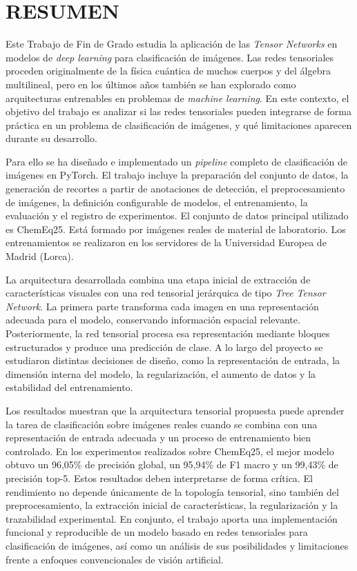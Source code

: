 \chapter*{RESUMEN}\label{sec:Resumen}

Este Trabajo de Fin de Grado estudia la aplicación de las \textit{Tensor Networks} en modelos de \textit{deep learning} para clasificación de imágenes. Las redes tensoriales proceden originalmente de la física cuántica de muchos cuerpos y del álgebra multilineal, pero en los últimos años también se han explorado como arquitecturas entrenables en problemas de \textit{machine learning}. En este contexto, el objetivo del trabajo es analizar si las redes tensoriales pueden integrarse de forma práctica en un problema de clasificación de imágenes, y qué limitaciones aparecen durante su desarrollo.

Para ello se ha diseñado e implementado un \textit{pipeline} completo de clasificación de imágenes en PyTorch. El trabajo incluye la preparación del conjunto de datos, la generación de recortes a partir de anotaciones de detección, el preprocesamiento de imágenes, la definición configurable de modelos, el entrenamiento, la evaluación y el registro de experimentos. El conjunto de datos principal utilizado es ChemEq25. Está formado por imágenes reales de material de laboratorio. Los entrenamientos se realizaron en los servidores de la Universidad Europea de Madrid (Lorca).

La arquitectura desarrollada combina una etapa inicial de extracción de características visuales con una red tensorial jerárquica de tipo \textit{Tree Tensor Network}. La primera parte transforma cada imagen en una representación adecuada para el modelo, conservando información espacial relevante. Posteriormente, la red tensorial procesa esa representación mediante bloques estructurados y produce una predicción de clase. A lo largo del proyecto se estudiaron distintas decisiones de diseño, como la representación de entrada, la dimensión interna del modelo, la regularización, el aumento de datos y la estabilidad del entrenamiento.

Los resultados muestran que la arquitectura tensorial propuesta puede aprender la tarea de clasificación sobre imágenes reales cuando se combina con una representación de entrada adecuada y un proceso de entrenamiento bien controlado. En los experimentos realizados sobre ChemEq25, el mejor modelo obtuvo un 96,05\% de precisión global, un 95,94\% de F1 macro y un 99,43\% de precisión top-5. Estos resultados deben interpretarse de forma crítica. El rendimiento no depende únicamente de la topología tensorial, sino también del preprocesamiento, la extracción inicial de características, la regularización y la trazabilidad experimental. En conjunto, el trabajo aporta una implementación funcional y reproducible de un modelo basado en redes tensoriales para clasificación de imágenes, así como un análisis de sus posibilidades y limitaciones frente a enfoques convencionales de visión artificial.

